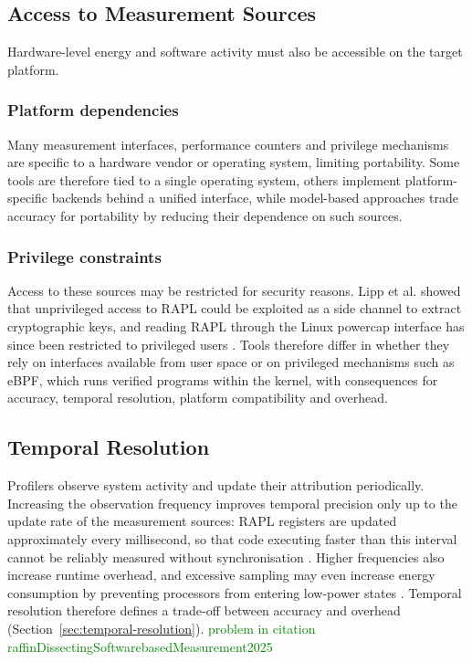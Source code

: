 \documentclass[
  acmsmall,
  screen,
  review,
  xcolor={dvipsnames,usenames}
]{acmart}
\newcommand{\iness}[1]{\textcolor{green}{#1}}
\begin{document}
\subsection{Access to Measurement Sources}

Hardware-level energy and software activity must also be accessible on the target platform.

\subsubsection{\textbf{Platform dependencies}}

Many measurement interfaces, performance counters and privilege mechanisms are specific to a hardware vendor or operating system, limiting portability. Some tools are therefore tied to a single operating system, others implement platform-specific backends behind a unified interface, while model-based approaches trade accuracy for portability by reducing their dependence on such sources.

\subsubsection{\textbf{Privilege constraints}}

Access to these sources may be restricted for security reasons. Lipp et al. \cite{lippPLATYPUSSoftwarebasedPower2021} showed that unprivileged access to RAPL could be exploited as a side channel to extract cryptographic keys, and reading RAPL through the Linux powercap interface has since been restricted to privileged users \cite{noureddinePowerJoularJoularJXMultiPlatform2022}. Tools therefore differ in whether they rely on interfaces available from user space or on privileged mechanisms such as eBPF, which runs verified programs within the kernel, with consequences for accuracy, temporal resolution, platform compatibility and overhead.

\subsection{Temporal Resolution}

Profilers observe system activity and update their attribution periodically. Increasing the observation frequency improves temporal precision only up to the update rate of the measurement sources: RAPL registers are updated approximately every millisecond, so that code executing faster than this interval cannot be reliably measured without synchronisation \cite{khanEnergyProfilingUsing2015,khanRAPLActionExperiences2018}. Higher frequencies also increase runtime overhead, and excessive sampling may even increase energy consumption by preventing processors from entering low-power states \cite{raffinDissectingSoftwarebasedMeasurement2025}. Temporal resolution therefore defines a trade-off between accuracy and overhead (Section~\ref{sec:temporal-resolution}).
\iness{problem in citation raffinDissectingSoftwarebasedMeasurement2025}
\end{document}
